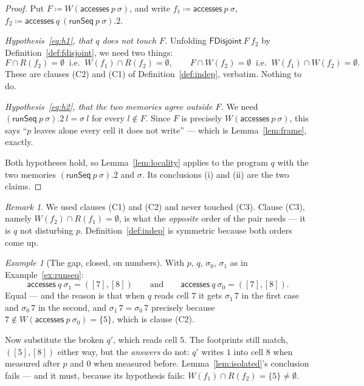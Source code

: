 \documentclass[11pt,a4paper]{article}
\theoremstyle{definition}
\theoremstyle{plain}
\theoremstyle{remark}
\newtheorem{remark}[definition]{Remark}
\newtheorem{example}[definition]{Example}
\newcommand{\st}{\sigma}
\newcommand{\reads}[1]{R(#1)}
\newcommand{\writes}[1]{W(#1)}
\newcommand{\acc}{\mathsf{accesses}}
\newcommand{\runSeq}{\mathsf{runSeq}}
\begin{document}
\begin{proof}
Put $F \coloneqq \writes{\acc\ p\ \st}$, and write $f_1 \coloneqq \acc\ p\ \st$,
$f_2 \coloneqq \acc\ q\ (\runSeq\ p\ \st).2$.

\emph{Hypothesis~\eqref{eq:h1}, that $q$ does not touch $F$.} Unfolding
$\mathsf{FDisjoint}\ F\ f_2$ by Definition~\ref{def:fdisjoint}, we need two things:
\[
  F \cap \reads{f_2} = \emptyset \ \text{ i.e. } \ \writes{f_1} \cap \reads{f_2} = \emptyset,
  \qquad
  F \cap \writes{f_2} = \emptyset \ \text{ i.e. } \ \writes{f_1} \cap \writes{f_2} = \emptyset .
\]
These are clauses (C2) and (C1) of Definition~\ref{def:indep}, verbatim. Nothing to do.

\emph{Hypothesis~\eqref{eq:h2}, that the two memories agree outside $F$.} We need
$(\runSeq\ p\ \st).2\ l = \st\ l$ for every $l \notin F$. Since $F$ is precisely
$\writes{\acc\ p\ \st}$, this says ``$p$ leaves alone every cell it does not write'' --- which
is Lemma~\ref{lem:frame}, exactly.

Both hypotheses hold, so Lemma~\ref{lem:locality} applies to the program $q$ with the two
memories $(\runSeq\ p\ \st).2$ and $\st$. Its conclusions (i) and (ii) are the two claims.
\end{proof}

\begin{remark}\label{rem:c3}
We used clauses (C1) and (C2) and never touched (C3). Clause (C3), namely
$\writes{f_2} \cap \reads{f_1} = \emptyset$, is what the \emph{opposite} order of the pair
needs --- it is $q$ not disturbing $p$. Definition~\ref{def:indep} is symmetric because both
orders come up.
\end{remark}

\begin{example}[The gap, closed, on numbers]\label{ex:isolated}
With $p$, $q$, $\st_0$, $\st_1$ as in Example~\ref{ex:runseq}:
\[
  \acc\ q\ \st_1 = ([7],[8]) \qquad\text{and}\qquad \acc\ q\ \st_0 = ([7],[8]) .
\]
Equal --- and the reason is that when $q$ reads cell $7$ it gets $\st_1\,7$ in the first case
and $\st_0\,7$ in the second, and $\st_1\,7 = \st_0\,7$ precisely because
$7 \notin \writes{\acc\ p\ \st_0} = \{5\}$, which is clause (C2).

Now substitute the broken $q'$, which reads cell $5$. The footprints still match,
$([5],[8])$ either way, but the \emph{answers} do not: $q'$ writes $1$ into cell $8$ when
measured after $p$ and $0$ when measured before. Lemma~\ref{lem:isolated}'s conclusion
fails --- and it must, because its hypothesis fails:
$\writes{f_1} \cap \reads{f_2} = \{5\} \neq \emptyset$.
\end{example}
\end{document}
